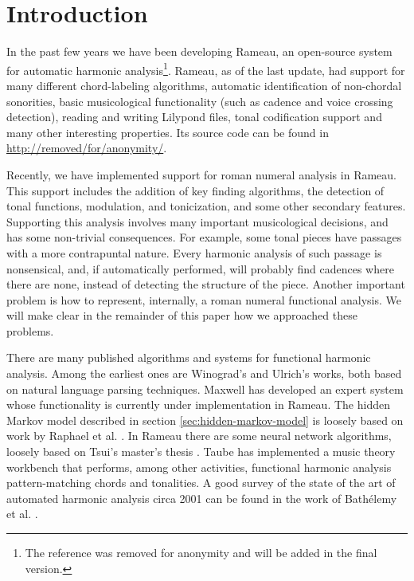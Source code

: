 
\section{Introduction}
\label{sec:introduction}

In the past few years we have been developing Rameau, an open-source
system for automatic harmonic analysis\footnote{The reference was
  removed for anonymity and will be added in the final
  version.}. Rameau, as of the last update, had support for many
different chord-labeling algorithms, automatic identification of
non-chordal sonorities, basic musicological functionality (such as
cadence and voice crossing detection), reading and writing Lilypond
\cite{nienhuys.ea08:lilypond} files, tonal codification support and
many other interesting properties. Its source code can be found in
\url{http://removed/for/anonymity/}.

Recently, we have implemented support for roman numeral analysis in
Rameau. This support includes the addition of key finding algorithms,
the detection of tonal functions, modulation, and tonicization, and
some other secondary features. Supporting this analysis involves many
important musicological decisions, and has some non-trivial
consequences. For example, some tonal pieces have passages with a more
contrapuntal nature. Every harmonic analysis of such passage is
nonsensical, and, if automatically performed, will probably find
cadences where there are none, instead of detecting the structure of
the piece.  Another important problem is how to represent, internally,
a roman numeral functional analysis. We will make clear in the
remainder of this paper how we approached these problems.

There are many published algorithms and systems for functional
harmonic analysis. Among the earliest ones are Winograd's
\cite{winograd68:linguistics} and Ulrich's \cite{ulrich77:analysis}
works, both based on natural language parsing techniques. Maxwell
\cite{maxwell92:expert} has developed an expert system whose
functionality is currently under implementation in Rameau. The hidden
Markov model described in section \ref{sec:hidden-markov-model} is
loosely based on work by Raphael et
al. \cite{raphael.ea03:harmonic}. In Rameau there are some neural
network algorithms, loosely based on Tsui's master's thesis
\cite{tsui02:harmonic}. Taube \cite{taube99:automatic} has implemented
a music theory workbench that performs, among other activities,
functional harmonic analysis pattern-matching chords and tonalities. A
good survey of the state of the art of automated harmonic analysis
circa 2001 can be found in the work of Bathélemy et
al. \cite{barthelemy.ea01:figured}.

